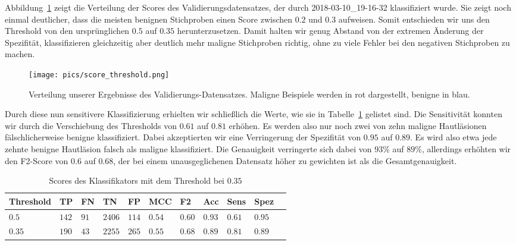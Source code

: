 Abbildung~\ref{fig:verteilung} zeigt die Verteilung der Scores des Validierungsdatensatzes, der durch 2018-03-10\_19-16-32 klassifiziert wurde. Sie zeigt noch einmal deutlicher, dass die meisten benignen Stichproben einen Score zwischen $0.2$ und $0.3$ aufweisen. Somit entschieden wir uns den Threshold von den ursprünglichen $0.5$ auf $0.35$ herunterzusetzen. Damit halten wir genug Abstand von der extremen Änderung der Spezifität, klassifizieren gleichzeitig aber deutlich mehr maligne Stichproben richtig, ohne zu viele Fehler bei den negativen Stichproben zu machen. 

\begin{figure}[htb!]
	\begin{center}
		\texttt{[image: pics/score\_threshold.png]}
		\caption{Verteilung unserer Ergebnisse des Validierungs-Datensatzes. Maligne Beispiele werden in rot dargestellt, benigne in blau.}
		\label{fig:verteilung}
    \end{center}
\end{figure}


Durch diese nun sensitivere Klassifizierung erhielten wir schließlich die Werte, wie sie in Tabelle~\ref{tab:final_scores} gelistet sind. Die Sensitivität konnten wir durch die Verschiebung des Thresholds von $0.61$ auf $0.81$ erhöhen. Es werden also nur noch zwei von zehn maligne Hautläsionen fälschlicherweise benigne klassifiziert. Dabei akzeptierten wir eine Verringerung der Spezifität von $0.95$ auf $0.89$. Es wird also etwa jede zehnte benigne Hautläsion falsch als maligne klassifiziert. Die Genauigkeit verringerte sich dabei von $93\%$ auf $89\%$, allerdings erhöhten wir den F2-Score von $0.6$ auf $0.68$, der bei einem unausgeglichenen Datensatz höher zu gewichten ist als die Gesamtgenauigkeit.

\begin{table}[htb!]
\begin{center}
\begin{tabular}{lllllllllll}
	\toprule
 	Threshold  & TP & FN & TN & FP & MCC & F2 & Acc & Sens & Spez\\
	\midrule
    $0.5$ & $142$&	$91$ &	$2406$ &	$114$ &	$0.54$ 	&$0.60$	&$0.93$	&$0.61$&	$0.95$ \\
	$0.35$ & $190$ & $43$ &	$2255$ &	$265$ &	$0.55$ &	$0.68$&	$0.89$ &	$0.81$ & $0.89$\\
 \bottomrule
 \end{tabular}
 \end{center}
  \caption{Scores des Klassifikators mit dem Threshold bei $0.35$}
 \label{tab:final_scores}
 \end{table}

